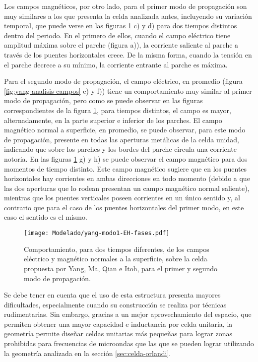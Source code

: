 Los campos magnéticos, por otro lado, para el primer modo de propagación son muy similares a los que presenta la celda analizada antes, incluyendo su variación temporal, que puede verse en las figuras \ref{fig:yang-analisis-campos-fases} c) y d) para dos tiempos distintos dentro del periodo. En el primero de ellos, cuando el campo eléctrico tiene amplitud máxima sobre el parche (figura a)), la corriente saliente al parche a través de los puentes horizontales crece. De la misma forma, cuando la tensión en el parche decrece a su mínimo, la corriente entrante al parche es máxima.

Para el segundo modo de propagación, el campo eléctrico, en promedio (figura \ref{fig:yang-analisis-campos} e) y f)) tiene un comportamiento muy similar al primer modo de propagación, pero como se puede observar en las figuras correspondientes de la figura \ref{fig:yang-analisis-campos-fases}, para tiempos distintos, el campo es mayor, alternadamente, en la parte superior e inferior de los parches. El campo magnético normal a superficie, en promedio, se puede observar, para este modo de propagación, presente en todas las aperturas metálicas de la celda unidad, indicando que sobre los parches y los bordes del parche circula una corriente notoria. En las figuras \ref{fig:yang-analisis-campos-fases} g) y h) se puede observar el campo magnético para dos momentos de tiempo distinto. Este campo magnético sugiere que en los puentes horizontales hay corrientes en ambas direcciones en todo momento (debido a que las dos aperturas que lo rodean presentan un campo magnético normal saliente), mientras que los puentes verticales poseen corrientes en un único sentido y, al contrario que para el caso de los puentes horizontales del primer modo, en este caso el sentido es el mismo.

\begin{figure}[h]
	\centering
	\texttt{[image: Modelado/yang-modo1-EH-fases.pdf]}
	\caption{Comportamiento, para dos tiempos diferentes, de los campos eléctrico y magnético normales a la superficie, sobre la celda propuesta por Yang, Ma, Qian e Itoh, para el primer y segundo modo de propagación.}
	\label{fig:yang-analisis-campos-fases}
\end{figure}


Se debe tener en cuenta que el uso de esta estructura presenta mayores dificultades, especialmente cuando su construcción se realiza por técnicas rudimentarias. Sin embargo, gracias a un mejor aprovechamiento del espacio, que permiten obtener una mayor capacidad e inductancia por celda unitaria, la geometría permite diseñar celdas unitarias más pequeñas para lograr zonas prohibidas para frecuencias de microondas que las que se pueden lograr utilizando la geometría analizada en la sección \ref{sec:celda-orlandi}.


